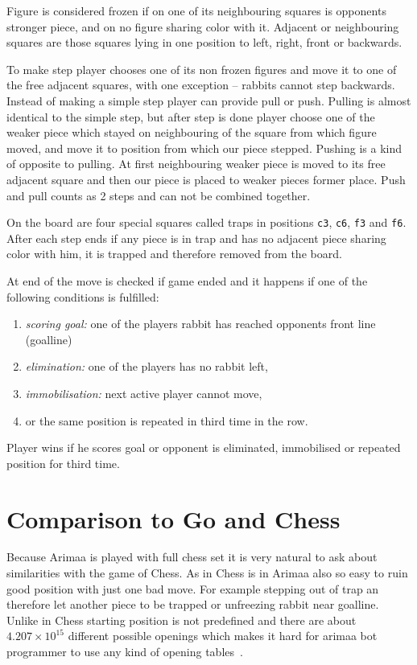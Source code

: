 Figure is considered frozen if on one of its neighbouring squares is opponents
stronger piece, and on no figure sharing color with it. Adjacent or neighbouring
squares are those squares lying in one position to left, right, front or
backwards.


To make step player chooses one of its non frozen figures and move it to one of
the free adjacent squares, with one exception -- rabbits cannot step backwards.
Instead of making a simple step player can provide pull or push. Pulling is
almost identical to the simple step, but after step is done player choose one
of the weaker piece which stayed on neighbouring of the square from which
figure moved, and move it to position from which our piece stepped. Pushing is
a kind of opposite to pulling. At first neighbouring weaker piece is moved to
its free adjacent square and then our piece is placed to weaker pieces former
place. Push and pull counts as 2 steps and can not be combined together.

On the board are four special squares called traps in positions \texttt{c3},
\texttt{c6}, \texttt{f3} and \texttt{f6}. After each step ends if any piece is
in trap and has no adjacent piece sharing color with him, it is trapped and
therefore removed from the board.

At end of the move is checked if game ended and it happens if one of the
following conditions is fulfilled:
\begin{enumerate}
\item \emph{scoring goal:} one of the players rabbit has reached opponents front line (goalline)
\item \emph{elimination:} one of the players has no rabbit left,
\item \emph{immobilisation:} next active player cannot move,
\item or the same position is repeated in third time in the row.
\end{enumerate}

Player wins if he scores goal or opponent is eliminated, immobilised or
repeated position for third time.


\section{Comparison to Go and Chess}
Because Arimaa is played with full chess set it is very natural to ask about
similarities with the game of Chess. As in Chess is in Arimaa also so easy to
ruin good position with just one bad move. For example stepping out of trap an
therefore let another piece to be trapped or unfreezing rabbit near goalline.
Unlike in Chess starting position is not predefined and there are about
$4.207\times10^{15}$ different possible openings which makes it hard for arimaa
bot programmer to use any kind of opening tables~\cite{COX}.

